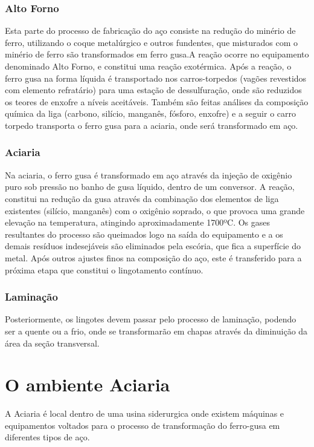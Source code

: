 \subsubsection{Alto Forno}
Esta parte do processo de fabricação do aço consiste na redução do minério de ferro, utilizando o coque metalúrgico e outros fundentes, que misturados com o minério de ferro são transformados em ferro gusa.A reação ocorre no equipamento denominado Alto Forno, e constitui uma reação exotérmica. Após a reação, o ferro gusa na forma líquida é transportado nos carros-torpedos (vagões revestidos com elemento refratário) para uma estação de dessulfuração, onde são reduzidos os teores de enxofre a níveis aceitáveis. Também são feitas análises da composição química da liga (carbono, silício, manganês, fósforo, enxofre) e a seguir o carro torpedo transporta o ferro gusa para a aciaria, onde será transformado em aço.

\subsubsection{Aciaria}
Na aciaria, o ferro gusa é transformado em aço através da injeção de oxigênio puro sob pressão no banho de gusa líquido, dentro de um conversor. A reação, constitui na redução da gusa através da combinação dos elementos de liga existentes (silício, manganês) com o oxigênio soprado, o que provoca uma grande elevação na temperatura, atingindo aproximadamente 1700ºC.
Os gases resultantes do processo são queimados logo na saída do equipamento e a os demais resíduos indesejáveis são eliminados pela escória, que fica a superfície do metal.
Após outros ajustes finos na composição do aço, este é transferido para a próxima etapa que constitui o lingotamento contínuo. 

\subsubsection{Laminação}
Posteriormente, os lingotes devem passar pelo processo de laminação, podendo ser a quente ou a frio, onde se transformarão em chapas através da diminuição da área da seção transversal.


\section{O ambiente Aciaria}
A Aciaria é local dentro de uma usina siderurgica onde existem máquinas e equipamentos voltados para o processo de transformação do ferro-gusa em diferentes tipos de aço. \cite{WIKI}

